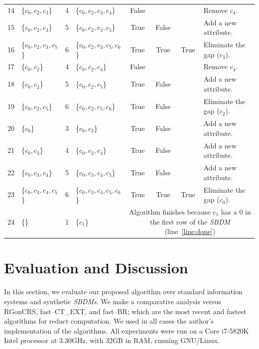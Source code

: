 \documentclass[authoryear,preprint,review,12pt]{elsarticle}
\begin{document}
\begin{table}[!htb]
\begin{tabular}{|c|l|c|l|c|c|c|l|}
    		14 & \{$c_0,c_2,c_3$\} 		& 4 & \{$c_0,c_2,c_3,c_4$\}		& False &   &   & Remove $c_4$.\\
    		15 & \{$c_0,c_2,c_3$\}		& 5 & \{$c_0,c_2,c_3,c_5$\}		& True & False &   & Add a new attribute.\\
    		16 & \{$c_0,c_2,c_3,c_5$\}	& 6 & \{$c_0,c_2,c_3,c_5,c_6$\} 	& True & True & True & Eliminate the gap ($c_3$).\\
    		17 & \{$c_0,c_2$\} 			& 4 & \{$c_0,c_2,c_4$\}			& False &   &   & Remove $c_4$.\\
    		18 & \{$c_0,c_2$\}			& 5 & \{$c_0,c_2,c_5$\}			& True & False &   & Add a new attribute.\\
    		19 & \{$c_0,c_2,c_5$\}		& 6 & \{$c_0,c_2,c_5,c_6$\}		& True & False &   & Eliminate the gap ($c_2$).\\
    		20 & \{$c_0$\} 				& 3 & \{$c_0,c_3$\}				& True & False &   & Add a new attribute.\\    		
    		21 & \{$c_0,c_3$\}			& 4 & \{$c_0,c_3,c_4$\}			& True & False &   & Add a new attribute.\\
    		22 & \{$c_0,c_3,c_4$\}		& 5 & \{$c_0,c_3,c_4,c_5$\}		& True & False &   & Add a new attribute.\\
    		23 & \{$c_0,c_3,c_4,c_5$\}	& 6 & \{$c_0,c_3,c_4,c_5,c_6$\} 	& True & True & True & Eliminate the gap ($c_0$).\\
    		\hline
    		24 & \{\} 					& 1 & \{$c_1$\} 					& 
    		\multicolumn{4}{p{5cm}|}{Algorithm finishes because $c_1$ has a 0 in the first row of the \textit{SBDM} (line~\ref{line:done})}\\
    		\hline
		\end{tabular}
	\end{table}
	
%
\section{Evaluation and Discussion}\label{evaluation}
	In this section, we evaluate our proposed algorithm over standard information systems \citep{Bache13} and synthetic \textit{SBDMs}. We make a comparative analysis versus RGonCRS, fast--CT\_EXT, and fast--BR; which are the most recent and fastest algorithms for reduct computation. We used in all cases the author's implementation of the algorithms. All experiments were run on a Core i7-5820K Intel processor at 3.30GHz, with 32GB in RAM, running GNU/Linux.
	
\end{document}
